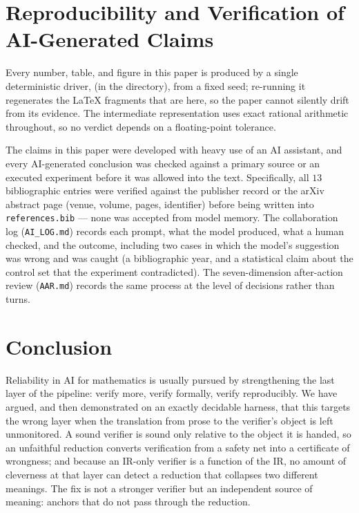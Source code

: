 \documentclass[11pt]{article}
\theoremstyle{definition}
\begin{document}
\section{Reproducibility and Verification of AI-Generated Claims}
\label{sec:repro}

\begin{sloppypar}
Every number, table, and figure in this paper is produced by a single
deterministic driver,  (in the 
directory), from a fixed seed; re-running it regenerates the \LaTeX{} fragments
that are \verb|| here, so the paper cannot silently drift from its
evidence. The intermediate representation uses exact rational arithmetic
throughout, so no verdict depends on a floating-point tolerance.
\end{sloppypar}

The claims in this paper were developed with heavy use of an AI assistant, and
every AI-generated conclusion was checked against a primary source or an executed
experiment before it was allowed into the text. Specifically, all $13$
bibliographic entries were verified against the publisher record or the arXiv
abstract page (venue, volume, pages, identifier) before being written into
\texttt{references.bib} --- none was accepted from model memory. The
collaboration log (\texttt{AI\_LOG.md}) records each prompt, what the model
produced, what a human checked, and the outcome, including two cases in which the
model's suggestion was wrong and was caught (a bibliographic year, and a
statistical claim about the control set that the experiment contradicted). The
seven-dimension after-action review (\texttt{AAR.md}) records the same process at
the level of decisions rather than turns.

\section{Conclusion}
\label{sec:conclusion}

Reliability in AI for mathematics is usually pursued by strengthening the last
layer of the pipeline: verify more, verify formally, verify reproducibly. We have
argued, and then demonstrated on an exactly decidable harness, that this targets
the wrong layer when the translation from prose to the verifier's object is left
unmonitored. A sound verifier is sound only relative to the object it is handed,
so an unfaithful reduction converts verification from a safety net into a
certificate of wrongness; and because an IR-only verifier is a function of the
IR, no amount of cleverness at that layer can detect a reduction that collapses
two different meanings. The fix is not a stronger verifier but an independent
source of meaning: anchors that do not pass through the reduction.
\end{document}
